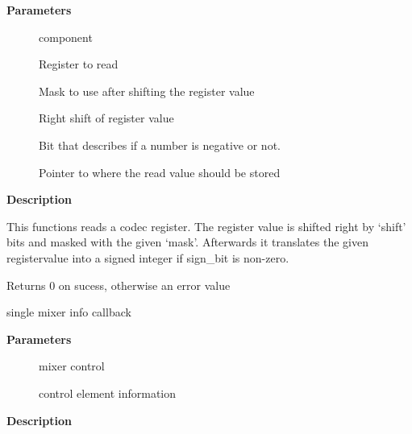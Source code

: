 \documentclass[a4paper,8pt,english]{sphinxmanual}
\begin{document}
\textbf{Parameters}
\begin{description}
\item[{}] \leavevmode
component

\item[{}] \leavevmode
Register to read

\item[{}] \leavevmode
Mask to use after shifting the register value

\item[{}] \leavevmode
Right shift of register value

\item[{}] \leavevmode
Bit that describes if a number is negative or not.

\item[{}] \leavevmode
Pointer to where the read value should be stored

\end{description}

\textbf{Description}

This functions reads a codec register. The register value is shifted right
by `shift' bits and masked with the given `mask'. Afterwards it translates
the given registervalue into a signed integer if sign\_bit is non-zero.

Returns 0 on sucess, otherwise an error value

\begin{fulllineitems}
\label{sound/kernel-api/alsa-driver-api:c.snd_soc_info_volsw}
single mixer info callback

\end{fulllineitems}


\textbf{Parameters}
\begin{description}
\item[{}] \leavevmode
mixer control

\item[{}] \leavevmode
control element information

\end{description}

\textbf{Description}
\end{document}
